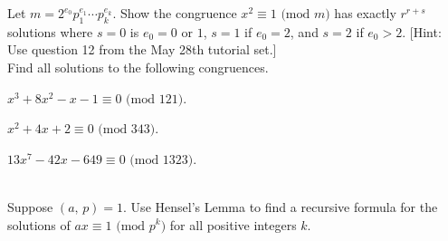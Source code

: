 \documentclass[a4paper,11pt]{article}
\theoremstyle{mythm}
\theoremstyle{mydef}
\renewcommand{\pmod}[1]{\text{ (mod $#1$)}}
\begin{document}
 Let $m=2^{e_0}p_1^{e_1} \cdots p_k^{e_k}$. Show the
congruence $x^2 \equiv 1 \pmod{m}$ has exactly $r^{r+s}$ solutions where $s=0$
is $e_0=0\text{ or }1$, $s=1$ if $e_0=2$, and $s=2$ if $e_0>2$. [Hint: Use
question 12 from the May 28th tutorial set.] \\

 Find all solutions to the following congruences.
\begin{enumerate*}[(a)]
\item $x^3+8x^2-x-1 \equiv 0 \pmod{121}$.
\item $x^2+4x+2 \equiv 0 \pmod{343}$.
\item $13x^7-42x-649 \equiv 0 \pmod{1323}$.
\end{enumerate*} \\

 Suppose $(a,\,p)=1$. Use Hensel's Lemma to find a
recursive formula for the solutions of $ax \equiv 1 \pmod{p^k}$ for all positive
integers $k$. \\
\end{document}
